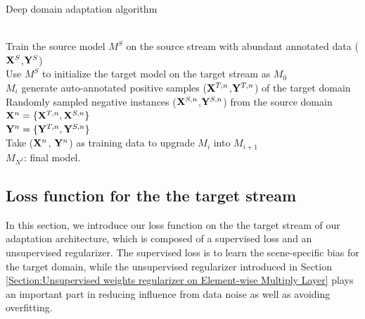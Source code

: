 \documentclass[runningheads]{llncs}
\begin{document}
\begin{algorithm}
\caption{Deep domain adaptation algorithm}
\label{algorithm:Deep domain adaptation algorithm}
\begin{algorithmic}[1]
 {} \\
\indent Train the source model $M^{S}$ on the source stream with abundant annotated data (${\bf X}^{S}$,${\bf Y}^{S}$)\\
\indent Use $M^{S}$ to initialize the target model on the target stream as $M_{0}$
 \\
\indent \indent $M_{i}$ generate auto-annotated positive samples (${\bf X}^{T,n}$,${\bf Y}^{T,n}$) of the target domain\\
\indent \indent Randomly sampled negative instances (${\bf X}^{S,n}$,${\bf Y}^{S,n}$) from the source domain \\
\indent \indent ${\bf X}^{n} = \{{\bf X}^{T,n}, {\bf X}^{S,n}\}$ \\
\indent \indent ${\bf Y}^{n} = \{{\bf Y}^{T,n}, {\bf Y}^{S,n}\}$ \\
\indent \indent Take (${\bf X}^{n}$, ${\bf Y}^{n}$) as training data to upgrade $M_{i}$ into $M_{i+1}$
\EndFor \\
\indent $M_{N^{I}}$: final model.
\EndProcedure
\end{algorithmic}
\end{algorithm}

\subsection{Loss function for the the target stream}
\label{Section:Loss function for the the target stream}

In this section, we introduce our loss function on the the target stream of our adaptation architecture, which is composed of a supervised loss and an unsupervised regularizer. The supervised loss is to learn the scene-specific bias for the target domain, while the unsupervised regularizer introduced in Section \ref{Section:Unsupervised weights regularizer on Element-wise Multiply Layer} plays an important part in reducing influence from data noise as well as avoiding overfitting.
\end{document}
